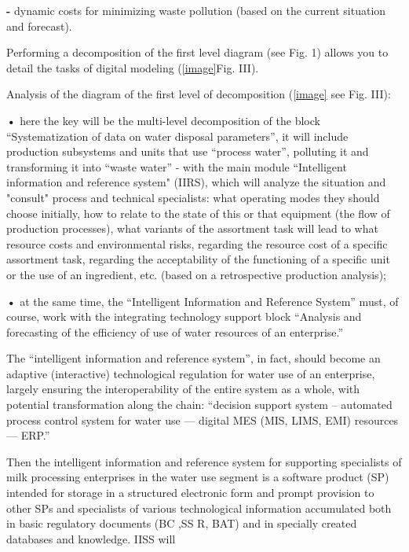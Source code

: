 \documentclass[a4paper, 10pt,twocolumn]{article}
\begin{document}
\par \quad  \textbf{-} dynamic costs for minimizing waste pollution
(based on the current situation and forecast).

\par Performing a decomposition of the first level diagram
(see Fig. 1) allows you to detail the tasks of digital
modeling (\ref{image}Fig. III).
\par Analysis of the diagram of the first level of decomposition (\ref{image} see Fig. III):
\par \textbf{•} here the key will be the multi-level decomposition of
the block “Systematization of data on water disposal
parameters”, it will include production subsystems
and units that use “process water”, polluting it
and transforming it into “waste water” - with the
main module “Intelligent information and reference
system" (IIRS), which will analyze the situation
and "consult" process and technical specialists: what
operating modes they should choose initially, how
to relate to the state of this or that equipment (the
flow of production processes), what variants of the
assortment task will lead to what resource costs and
environmental risks, regarding the resource cost of a
specific assortment task, regarding the acceptability
of the functioning of a specific unit or the use of an
ingredient, etc. (based on a retrospective production
analysis);
\par \textbf{•} at the same time, the “Intelligent Information and
Reference System” must, of course, work with the
integrating technology support block “Analysis and
forecasting of the efficiency of use of water resources of an enterprise.”
\par The “intelligent information and reference system”, in
fact, should become an adaptive (interactive) technological regulation for water use of an enterprise, largely
ensuring the interoperability of the entire system as a
whole, with potential transformation along the chain:
“decision support system – automated process control
system for water use — digital MES (MIS, LIMS, EMI)
resources — ERP.”
\par Then the intelligent information and reference system
for supporting specialists of milk processing enterprises
in the water use segment is a software product (SP)
intended for storage in a structured electronic form
and prompt provision to other SPs and specialists of
various technological information accumulated both in
basic regulatory documents (BC ,SS R, BAT) and in
specially created databases and knowledge. IISS will
\end{document}
